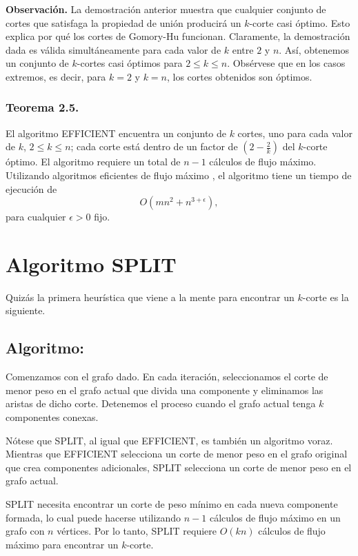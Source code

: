 \documentclass[a4paper, 12pt]{article}
\begin{document}
\textbf{Observación.} La demostración anterior muestra que cualquier conjunto de cortes que satisfaga la propiedad de unión  
producirá un \( k \)-corte casi óptimo. Esto explica por qué los cortes de Gomory-Hu funcionan.  
Claramente, la demostración dada es válida simultáneamente para cada valor de \( k \) entre \( 2 \) y \( n \).  
Así, obtenemos un conjunto de \( k \)-cortes casi óptimos para \( 2 \leq k \leq n \).  
Obsérvese que en los casos extremos, es decir, para \( k = 2 \) y \( k = n \), los cortes obtenidos son óptimos.

\subsubsection*{Teorema 2.5.} 
El algoritmo \textsc{EFFICIENT} encuentra un conjunto de \( k \) cortes, uno para cada valor de \( k \), \( 2 \leq k \leq n \);  
cada corte está dentro de un factor de \( (2 - \frac{2}{k}) \) del \( k \)-corte óptimo.  
El algoritmo requiere un total de \( n-1 \) cálculos de flujo máximo.  
Utilizando algoritmos eficientes de flujo máximo \cite{GT, KRT}, el algoritmo tiene un tiempo de ejecución de  
\[
O(mn^2 + n^{3+\epsilon}),
\]
para cualquier \( \epsilon > 0 \) fijo.

\section{Algoritmo SPLIT}

Quizás la primera heurística que viene a la mente para encontrar un \( k \)-corte es la siguiente.

\subsection*{Algoritmo:}
Comenzamos con el grafo dado. En cada iteración, seleccionamos el corte de menor peso en el grafo actual que divida una componente y eliminamos las aristas de dicho corte. Detenemos el proceso cuando el grafo actual tenga \( k \) componentes conexas.

Nótese que SPLIT, al igual que EFFICIENT, es también un algoritmo voraz. Mientras que EFFICIENT selecciona un corte de menor peso en el grafo original que crea componentes adicionales, SPLIT selecciona un corte de menor peso en el grafo actual.

SPLIT necesita encontrar un corte de peso mínimo en cada nueva componente formada, lo cual puede hacerse utilizando \( n - 1 \) cálculos de flujo máximo en un grafo con \( n \) vértices. Por lo tanto, SPLIT requiere \( O(kn) \) cálculos de flujo máximo para encontrar un \( k \)-corte.
\end{document}

